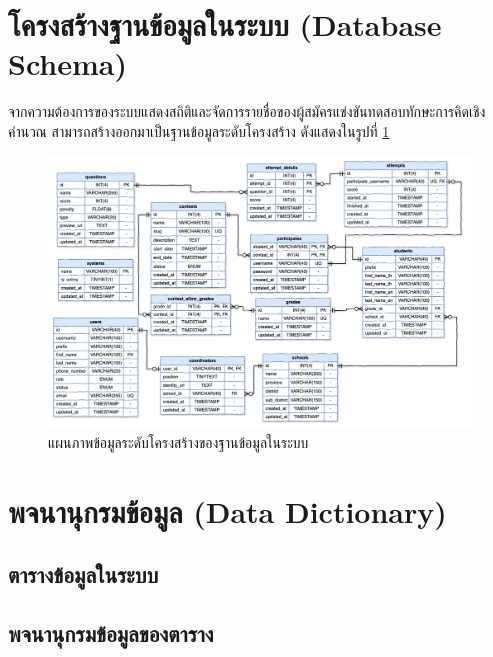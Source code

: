 \section{โครงสร้างฐานข้อมูลในระบบ (Database Schema)}

จากความต้องการของระบบแสดงสถิติและจัดการรายชื่อของผู้สมัครแข่งขันทดสอบทักษะการคิดเชิงคำนวณ สามารถสร้างออกมาเป็นฐานข้อมูลระดับโครงสร้าง ดังแสดงในรูปที่ \ref{fig:physical-database-diagram}

\begin{figure}[H]
    \centering
    \includegraphics[width=120mm,scale=1.0]{diagrams/database.png}
    \caption{แผนภาพข้อมูลระดับโครงสร้างของฐานข้อมูลในระบบ}
    \label{fig:physical-database-diagram}
\end{figure}

\section{พจนานุกรมข้อมูล (Data Dictionary)}

\subsection{ตารางข้อมูลในระบบ}


\subsection{พจนานุกรมข้อมูลของตาราง}













